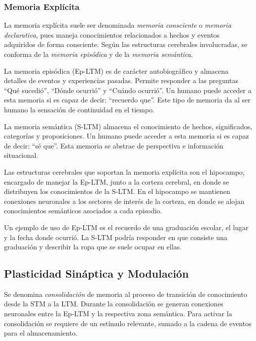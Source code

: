 \subsubsection{Memoria Expl\'icita}

La memoria expl\'icita suele ser denominada \textit{memoria consciente} o \textit{memoria declarativa}, pues maneja conocimientos relacionados a hechos y eventos adquiridos de forma consciente. Seg\'un las estructuras cerebrales involucradas, se conforma de la \textit{memoria epis\'odica} y de la \textit{memoria sem\'antica}.

La memoria epis\'odica (Ep-LTM) es de car\'acter  autobiogr\'afico y almacena detalles de eventos y experiencias pasadas. Permite responder a las preguntas ``Qu\'e sucedi\'o'', ``D\'onde ocurri\'o'' y ``Cu\'ando ocurri\'o''. Un humano puede acceder a esta memoria si es capaz de decir: ``recuerdo que''. Este tipo de memoria da al ser humano la sensaci\'on de continuidad en el tiempo.

La memoria sem\'antica (S-LTM) almacena el conocimiento de hechos, significados, categor\'ias y proposiciones. Un humano puede acceder a esta memoria si es capaz de decir: ``s\'e que''. Esta memoria se abstrae de perspectiva e informaci\'on situacional.

Las estructuras cerebrales que soportan la memoria expl\'icita son el hipocampo, encargado de manejar la Ep-LTM, junto a la corteza cerebral, en donde se distribuyen los conocimientos de la S-LTM. En el hipocampo se mantienen conexiones neuronales a los sectores de inter\'es de la corteza, en donde se alojan conocimientos sem\'anticos asociados a cada episodio.

Un ejemplo de uso de Ep-LTM es el recuerdo de una graduaci\'on escolar, el lugar y la fecha donde ocurri\'o. La S-LTM podr\'ia responder en que consiste una graduaci\'on y describir la ropa que se suele ocupar en ellas.


\subsection{Plasticidad Sin\'aptica y Modulaci\'on}

Se denomina \textit{consolidaci\'on} de memoria al proceso de transici\'on de conocimiento desde la STM a la LTM. Durante la consolidaci\'on se generan conexiones neuronales entre la Ep-LTM y la respectiva zona sem\'antica. Para activar la consolidaci\'on se requiere de un est\'imulo relevante, sumado a la cadena de eventos para el almacenamiento.


